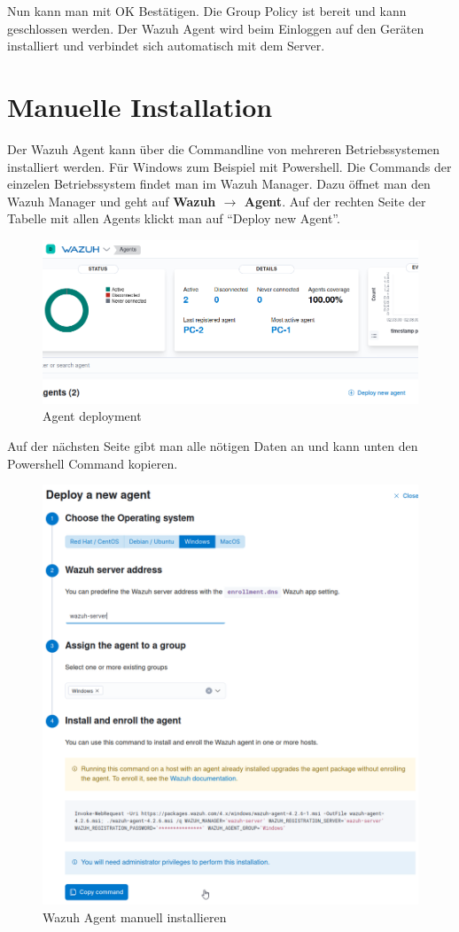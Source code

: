 Nun kann man mit OK Bestätigen.
Die Group Policy ist bereit und kann geschlossen werden.
Der Wazuh Agent wird beim Einloggen auf den Geräten installiert und verbindet sich automatisch mit dem Server.


\section{Manuelle Installation}

Der Wazuh Agent kann über die Commandline von mehreren Betriebssystemen installiert werden.
Für Windows zum Beispiel mit Powershell.
Die Commands der einzelen Betriebssystem findet man im Wazuh Manager.
Dazu öffnet man den Wazuh Manager und geht auf \textbf{Wazuh $\rightarrow$ Agent}.
Auf der rechten Seite der Tabelle mit allen Agents klickt man auf ``Deploy new Agent''.
\begin{figure}[H]
    \centering
    \includegraphics[width=0.7\linewidth]{../img/agent/deploy-new-agent.png}
    \caption{Agent deployment}
\end{figure}

Auf der nächsten Seite gibt man alle nötigen Daten an und kann unten den Powershell Command kopieren.
\begin{figure}[H]
    \centering
    \includegraphics[width=0.7\linewidth]{../img/agent/deploy-new-agent-2.png}
    \caption{Wazuh Agent manuell installieren}
\end{figure}

